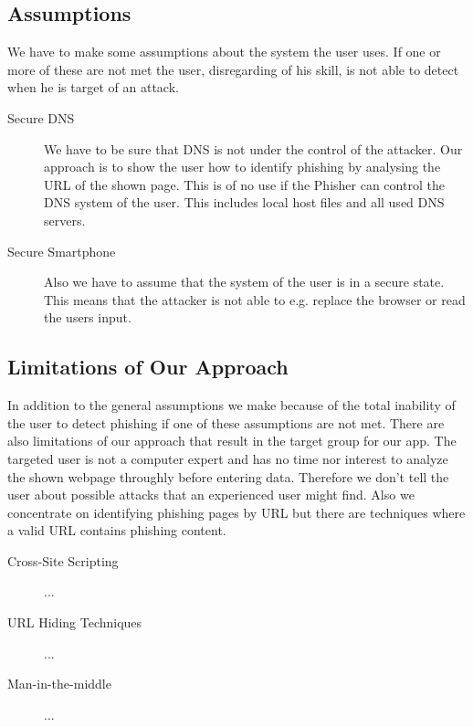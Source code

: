 \subsection{Assumptions}
We have to make some assumptions about the system the user uses. If one or more of these are not met the user, disregarding of his skill, is not able to detect when he is target of an attack.
\begin{description}
	\item[Secure DNS] We have to be sure that DNS is not under the control of the attacker.
	Our approach is to show the user how to identify phishing by analysing the URL of the shown page.
	This is of no use if the Phisher can control the DNS system of the user.
	This includes local host files and all used DNS servers.
	\item[Secure Smartphone] Also we have to assume that the system of the user is in a secure state.
	This means that the attacker is not able to e.g. replace the browser or read the users input.
\end{description}

\subsection{Limitations of Our Approach}
In addition to the general assumptions we make because of the total inability of the user to detect phishing if one of these assumptions are not met.
There are also limitations of our approach that result in the target group for our app.
The targeted user is not a computer expert and has no time nor interest to analyze the shown webpage throughly before entering data.
Therefore we don't tell the user about possible attacks that an experienced user might find.
Also we concentrate on identifying phishing pages by URL but there are techniques where a valid URL contains phishing content.
\begin{description}
	\item[Cross-Site Scripting] ...
	\item[URL Hiding Techniques] ...
	\item[Man-in-the-middle] ...
\end{description}

